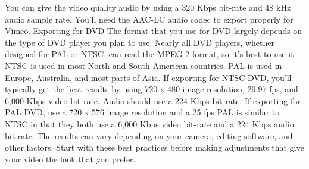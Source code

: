 You can give the video quality audio by using a 320 Kbps bit-rate and 48 kHz audio sample rate. You'll need the AAC-LC audio codec to export properly for Vimeo.
Exporting for DVD
The format that you use for DVD largely depends on the type of DVD player you plan to use. Nearly all DVD players, whether designed for PAL or NTSC, can read the MPEG-2 format, so it's best to use it. NTSC is used in most North and South American countries. PAL is used in Europe, Australia, and most parts of Asia.
If exporting for NTSC DVD, you'll typically get the best results by using 720 x 480 image resolution, 29.97 fps, and 6,000 Kbps video bit-rate. Audio should use a 224 Kbps bit-rate.
If exporting for PAL DVD, use a 720 x 576 image resolution and a 25 fps PAL is similar to NTSC in that they both use a 6,000 Kbps video bit-rate and a 224 Kbps audio bit-rate.
The results can vary depending on your camera, editing software, and other factors. Start with these best practices before making adjustments that give your video the look that you prefer.
